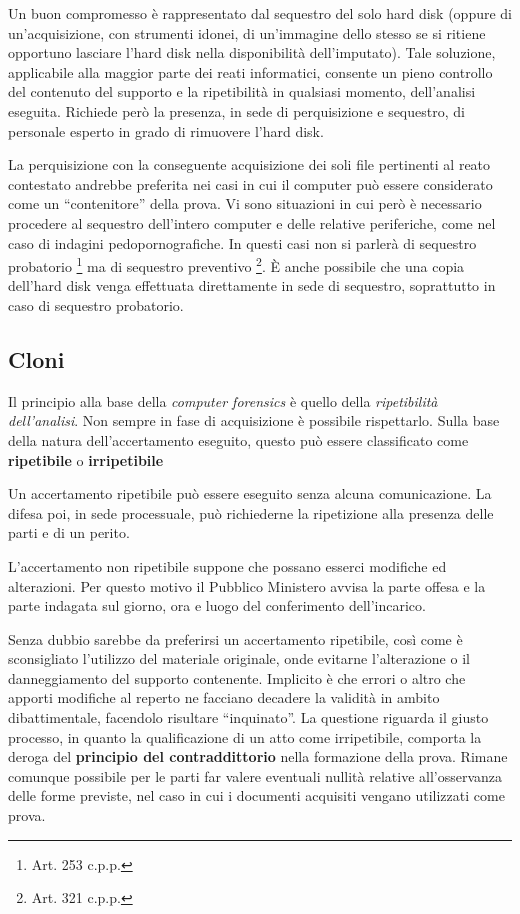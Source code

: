Un buon compromesso è rappresentato dal sequestro del solo hard disk (oppure di un'acquisizione, con strumenti idonei, di un'immagine dello stesso se si ritiene opportuno lasciare l'hard disk nella disponibilità dell'imputato).
Tale soluzione, applicabile alla maggior parte dei reati informatici, consente un pieno controllo del contenuto del supporto e la ripetibilità in qualsiasi momento, dell'analisi eseguita. Richiede però la presenza, in sede di perquisizione e sequestro, di personale esperto in grado di rimuovere l'hard disk.

La perquisizione con la conseguente acquisizione dei soli file pertinenti al reato contestato andrebbe preferita nei casi in cui il computer può essere considerato come un ``contenitore'' della prova. Vi sono situazioni in cui però è necessario procedere al sequestro dell'intero computer e delle relative periferiche, come nel caso di indagini pedopornografiche. In questi casi non si parlerà di sequestro probatorio \footnote{Art. 253 c.p.p.} ma di sequestro preventivo \footnote{Art. 321 c.p.p.}. \`E anche possibile che una copia dell'hard disk venga effettuata direttamente in sede di sequestro, soprattutto in caso di sequestro probatorio. 
 
\subsection{Cloni}

Il principio alla base della \textit{computer forensics} è quello della \textit{ripetibilità dell'analisi}. Non sempre in fase di acquisizione è possibile rispettarlo. Sulla base della natura dell'accertamento eseguito, questo può essere classificato come \textbf{ripetibile} o \textbf{irripetibile} 

Un accertamento ripetibile può essere eseguito senza alcuna comunicazione. La difesa poi, in sede processuale, può richiederne la ripetizione alla presenza delle parti e di un perito. 

L'accertamento non ripetibile suppone che possano esserci modifiche ed alterazioni. Per questo motivo il Pubblico Ministero avvisa la parte offesa e la parte indagata sul giorno, ora e luogo del conferimento dell'incarico.

Senza dubbio sarebbe da preferirsi un accertamento ripetibile, così come è sconsigliato l'utilizzo del materiale originale, onde evitarne l'alterazione o il danneggiamento del supporto contenente. 
Implicito è che errori o altro che apporti modifiche al reperto ne facciano decadere la validità in ambito dibattimentale, facendolo risultare ``inquinato''. La questione riguarda il giusto processo, in quanto la qualificazione di un atto come irripetibile, comporta la deroga del \textbf{principio del contraddittorio} nella formazione della prova. Rimane comunque possibile per le parti far valere eventuali nullità relative all'osservanza delle forme previste, nel caso in cui i documenti acquisiti vengano utilizzati come prova.

